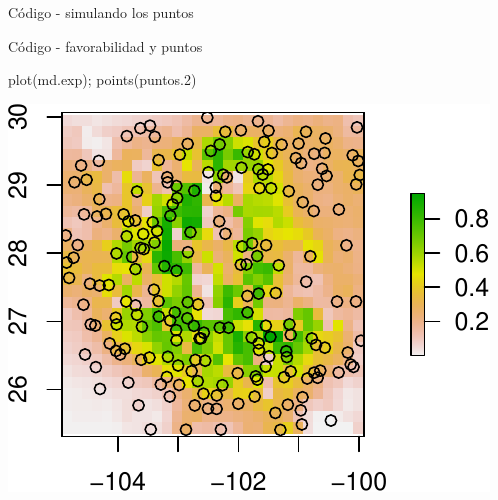 \documentclass[
  11pt,
  ignorenonframetext,
]{beamer}
\newenvironment{Shaded}{}{}
\newcommand{\AttributeTok}[1]{\textcolor[rgb]{0.49,0.56,0.16}{#1}}
\newcommand{\DecValTok}[1]{\textcolor[rgb]{0.25,0.63,0.44}{#1}}
\newcommand{\FloatTok}[1]{\textcolor[rgb]{0.25,0.63,0.44}{#1}}
\newcommand{\FunctionTok}[1]{\textcolor[rgb]{0.02,0.16,0.49}{#1}}
\newcommand{\NormalTok}[1]{#1}
\newcommand{\OtherTok}[1]{\textcolor[rgb]{0.00,0.44,0.13}{#1}}
\newcommand{\SpecialCharTok}[1]{\textcolor[rgb]{0.25,0.44,0.63}{#1}}
\begin{document}
\begin{frame}[fragile]{Código - simulando los puntos}
\protect\hypertarget{cuxf3digo---simulando-los-puntos}{}
\begin{Shaded}
\end{Shaded}
\end{frame}

\begin{frame}[fragile]{Código - favorabilidad y puntos}
\protect\hypertarget{cuxf3digo---favorabilidad-y-puntos}{}
\begin{Shaded}
\begin{Highlighting}[]
\FunctionTok{plot}\NormalTok{(md.exp); }\FunctionTok{points}\NormalTok{(puntos}\FloatTok{.2}\NormalTok{)}
\end{Highlighting}
\end{Shaded}

\begin{center}\includegraphics{Tutorial-spatstat-2_files/figure-beamer/unnamed-chunk-6-1} \end{center}
\end{frame}
\end{document}
